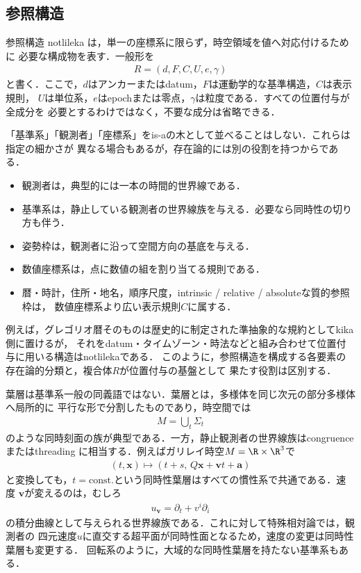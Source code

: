 \documentclass[../../main-detail.tex]{subfiles}
\begin{document}
\subsection{参照構造}
参照構造 notlileka は，単一の座標系に限らず，時空領域を値へ対応付けるために
必要な構成物を表す．一般形を
\begin{align*}
    R=(d,F,C,U,e,\gamma)
\end{align*}
と書く．ここで，$d$はアンカーまたはdatum，$F$は運動学的な基準構造，$C$は表示規則，
$U$は単位系，$e$はepochまたは零点，$\gamma$は粒度である．すべての位置付与が全成分を
必要とするわけではなく，不要な成分は省略できる．

「基準系」「観測者」「座標系」をis-aの木として並べることはしない．これらは指定の細かさが
異なる場合もあるが，存在論的には別の役割を持つからである．
\begin{itemize}
    \item 観測者は，典型的には一本の時間的世界線である．
    \item 基準系は，静止している観測者の世界線族を与える．必要なら同時性の切り方も伴う．
    \item 姿勢枠は，観測者に沿って空間方向の基底を与える．
    \item 数値座標系は，点に数値の組を割り当てる規則である．
    \item 暦・時計，住所・地名，順序尺度，intrinsic / relative / absoluteな質的参照枠は，
    数値座標系より広い表示規則$C$に属する．
\end{itemize}
例えば，グレゴリオ暦そのものは歴史的に制定された準抽象的な規約としてkika側に置けるが，
それをdatum・タイムゾーン・時法などと組み合わせて位置付与に用いる構造はnotlilekaである．
このように，参照構造を構成する各要素の存在論的分類と，複合体$R$が位置付与の基盤として
果たす役割は区別する．

葉層は基準系一般の同義語ではない．葉層とは，多様体を同じ次元の部分多様体へ局所的に
平行な形で分割したものであり，時空間では
\begin{align*}
    M=\bigcup_{t}\Sigma_t
\end{align*}
のような同時刻面の族が典型である．一方，静止観測者の世界線族はcongruenceまたはthreading
に相当する．例えばガリレイ時空$M=\R\times\R^3$で
\begin{align*}
    (t,\bm{x})\longmapsto
    (t+s,\,Q\bm{x}+\bm{v}t+\bm{a})
\end{align*}
と変換しても，$t=\text{const.}$という同時性葉層はすべての慣性系で共通である．速度
$\bm{v}$が変えるのは，むしろ
\begin{align*}
    u_{\bm{v}}
    =\partial_t+v^i\partial_i
\end{align*}
の積分曲線として与えられる世界線族である．これに対して特殊相対論では，観測者の
四元速度$u$に直交する超平面が同時性面となるため，速度の変更は同時性葉層も変更する．
回転系のように，大域的な同時性葉層を持たない基準系もある．
\end{document}

